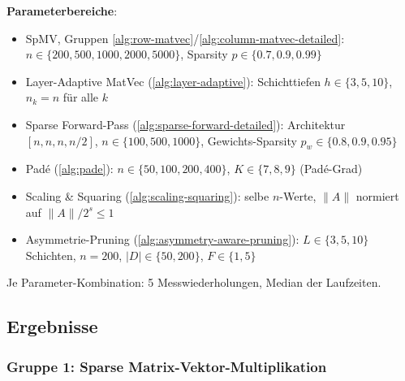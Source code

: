 \documentclass[a4paper,12pt]{report}
\theoremstyle{definition}
\begin{document}
	\textbf{Parameterbereiche}:
	\begin{itemize}
		\item SpMV, Gruppen \ref{alg:row-matvec}/\ref{alg:column-matvec-detailed}: $n \in \{200, 500, 1000, 2000, 5000\}$, Sparsity $p \in \{0.7, 0.9, 0.99\}$
		\item Layer-Adaptive MatVec (\ref{alg:layer-adaptive}): Schichttiefen $h \in \{3,5,10\}$, $n_k = n$ für alle $k$
		\item Sparse Forward-Pass (\ref{alg:sparse-forward-detailed}): Architektur $[n, n, n, n/2]$, $n \in \{100, 500, 1000\}$, Gewichts-Sparsity $p_w \in \{0.8, 0.9, 0.95\}$
		\item Padé (\ref{alg:pade}): $n \in \{50, 100, 200, 400\}$, $K \in \{7, 8, 9\}$ (Padé-Grad)
		\item Scaling \& Squaring (\ref{alg:scaling-squaring}): selbe $n$-Werte, $\|A\|$ normiert auf $\|A\|/2^s \leq 1$
		\item Asymmetrie-Pruning (\ref{alg:asymmetry-aware-pruning}): $L \in \{3,5,10\}$ Schichten, $n = 200$, $|D| \in \{50,200\}$, $F \in \{1,5\}$
	\end{itemize}

	Je Parameter-Kombination: 5 Messwiederholungen, Median der Laufzeiten.

	\subsection{Ergebnisse}

	\subsubsection{Gruppe 1: Sparse Matrix-Vektor-Multiplikation}
\end{document}
